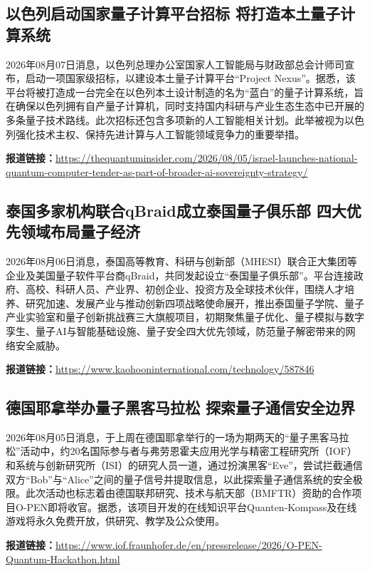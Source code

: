 \documentclass[12pt,a4paper]{ctexart}
\begin{document}
\subsection{ 以色列启动国家量子计算平台招标 将打造本土量子计算系统 }

2026年08月07日消息，以色列总理办公室国家人工智能局与财政部总会计师司宣布，启动一项国家级招标，以建设本土量子计算平台“Project Nexus”。据悉，该平台将被打造成一台完全在以色列本土设计制造的名为“蓝白”的量子计算系统，旨在确保以色列拥有自产量子计算机，同时支持国内科研与产业生态生态中已开展的多条量子技术路线。此次招标还包含多项新的人工智能相关计划。此举被视为以色列强化技术主权、保持先进计算与人工智能领域竞争力的重要举措。

\noindent\textbf{报道链接：}\url{https://thequantuminsider.com/2026/08/05/israel-launches-national-quantum-computer-tender-as-part-of-broader-ai-sovereignty-strategy/}

\subsection{ 泰国多家机构联合qBraid成立泰国量子俱乐部 四大优先领域布局量子经济 }

2026年08月06日消息，泰国高等教育、科研与创新部（MHESI）联合正大集团等企业及美国量子软件平台商qBraid，共同发起设立“泰国量子俱乐部”。平台连接政府、高校、科研人员、产业界、初创企业、投资方及全球技术伙伴，围绕人才培养、研究加速、发展产业与推动创新四项战略使命展开，推出泰国量子学院、量子产业实验室和量子创新挑战赛三大旗舰项目，初期聚焦量子优化、量子模拟与数字孪生、量子AI与智能基础设施、量子安全四大优先领域，防范量子解密带来的网络安全威胁。

\noindent\textbf{报道链接：}\url{https://www.kaohooninternational.com/technology/587846}

\subsection{ 德国耶拿举办量子黑客马拉松 探索量子通信安全边界 }

2026年08月05日消息，于上周在德国耶拿举行的一场为期两天的“量子黑客马拉松”活动中，约20名国际参与者与弗劳恩霍夫应用光学与精密工程研究所（IOF）和系统与创新研究所（ISI）的研究人员一道，通过扮演黑客“Eve”，尝试拦截通信双方“Bob”与“Alice”之间的量子信号并提取信息，以此探索量子通信系统的安全极限。此次活动也标志着由德国联邦研究、技术与航天部（BMFTR）资助的合作项目O-PEN即将收官。据悉，该项目开发的在线知识平台Quanten-Kompass及在线游戏将永久免费开放，供研究、教学及公众使用。

\noindent\textbf{报道链接：}\url{https://www.iof.fraunhofer.de/en/pressrelease/2026/O-PEN-Quantum-Hackathon.html}
\end{document}
